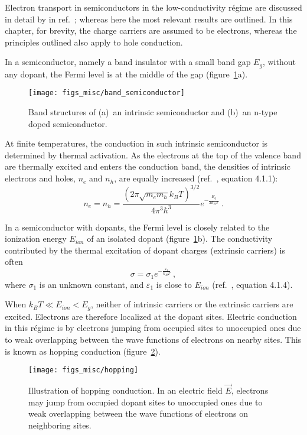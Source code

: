Electron transport in semiconductors in the low-conductivity r\'egime are discussed in detail by \citeauthor{schklovskii_efros} in ref.~\cite{schklovskii_efros}; whereas here the most relevant results are outlined. In this chapter, for brevity, the charge carriers are assumed to be electrons, whereas the principles outlined also apply to hole conduction.

In a semiconductor, namely a band insulator with a small band gap $E_g$, without any dopant, the Fermi level is at the middle of the gap (figure~\ref{fig:band_semiconductor}a). %
\begin{figure}[ht]%
    \centering%
    \texttt{[image: figs\_misc/band\_semiconductor]}%
    \caption[Band structures of an intrinsic semiconductor and an n-type doped semiconductor]{\label{fig:band_semiconductor}Band structures of (a)~an intrinsic semiconductor and (b)~an n-type doped semiconductor.}%
\end{figure}%
%
At finite temperatures, the conduction in such intrinsic semiconductor is determined by thermal activation. As the electrons at the top of the valence band are thermally excited and enters the conduction band, the densities of intrinsic electrons and holes, $n_e$ and $n_h$, are equally increased (ref.~\cite{schklovskii_efros}, equation 4.1.1):%
\begin{equation}
    n_e = n_h = \frac{\left(2\pi\sqrt{m_e m_h}k_B T\right)^{3/2}}{4\pi^3\hbar^3}e^{-\frac{E_g}{2 k_B T}}~.
\end{equation}

In a semiconductor with dopants, the Fermi level is closely related to the ionization energy $E_{ion}$ of an isolated dopant (figure~\ref{fig:band_semiconductor}b). The conductivity contributed by the thermal excitation of dopant charges (extrinsic carriers) is often%
\begin{equation}
    \sigma = \sigma_1 e^{-\frac{\varepsilon_1}{k_B T}}~,\label{eq:activation}
\end{equation}%
where $\sigma_1$ is an unknown constant, and $\varepsilon_1$ is close to $E_{ion}$ (ref.~\cite{schklovskii_efros}, equation 4.1.4).

When $k_B T \ll E_{ion} < E_g$, neither of intrinsic carriers or the extrinsic carriers are excited. Electrons are therefore localized at the dopant sites. Electric conduction in this r\'egime is by electrons jumping from occupied sites to unoccupied ones due to weak overlapping between the wave functions of electrons on nearby sites. This is known as hopping conduction (figure~\ref{fig:hopping}).%
\begin{figure}[ht]%
    \centering%
    \texttt{[image: figs\_misc/hopping]}%
    \caption[Illustration of hopping conduction]{\label{fig:hopping}Illustration of hopping conduction. In an electric field $\vec{E}$, electrons may jump from occupied dopant sites to unoccupied ones due to weak overlapping between the wave functions of electrons on neighboring sites.}%
\end{figure}%


